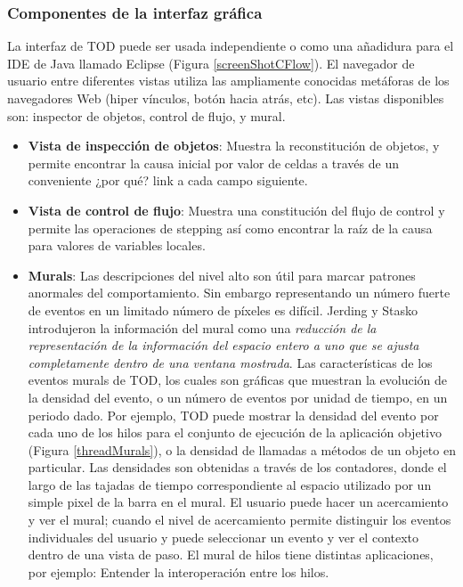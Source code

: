 \documentclass[12pt,legalpaper]{report}
\begin{document}
			\subsubsection{Componentes de la interfaz gráfica}

La interfaz de TOD puede ser usada independiente o como una añadidura para el IDE de Java llamado Eclipse (Figura \ref{screenShotCFlow}).  El navegador de usuario entre diferentes vistas utiliza las ampliamente conocidas metáforas de los navegadores Web (hiper vínculos, botón hacia atrás, etc).  Las vistas disponibles son:  inspector de objetos, control de flujo, y mural.  

\begin{itemize}	
	
	\item \textbf{Vista de inspección de objetos}: Muestra la reconstitución de objetos, y permite encontrar la causa inicial por valor de celdas a través de un conveniente ¿por qué? link a cada campo siguiente. 
	
	\item \textbf{Vista de control de flujo}: Muestra una constitución del flujo de control y permite las operaciones de stepping así como encontrar la raíz de la causa para valores de variables locales.

	\item \textbf{Murals}: Las descripciones del nivel alto son útil para marcar patrones anormales del comportamiento.  Sin embargo representando un número fuerte de eventos en un limitado número de píxeles es difícil.  Jerding y Stasko introdujeron la información del mural \cite{mural} como una \textit{reducción de la representación de la información del espacio entero a uno que se ajusta completamente dentro de una ventana mostrada}.  Las características de los eventos murals de TOD, los cuales son gráficas que muestran la evolución de la densidad del evento, o un número de eventos por unidad de tiempo, en un periodo dado.  Por ejemplo, TOD puede mostrar la densidad del evento por cada uno de los hilos para el conjunto de ejecución de la aplicación objetivo (Figura \ref{threadMurals}), o la densidad de llamadas a métodos de un objeto en particular.  Las densidades son obtenidas a través  de los contadores, donde el largo de las tajadas de tiempo correspondiente al espacio utilizado por un simple pixel de la barra en el mural.  El usuario puede hacer un acercamiento y ver el mural;  cuando el nivel de acercamiento permite distinguir los eventos individuales del usuario y puede seleccionar un evento y ver el contexto dentro de una vista de paso.  El mural de hilos tiene distintas aplicaciones, por ejemplo: Entender la interoperación entre los hilos.
	
\end{itemize}
\end{document}
